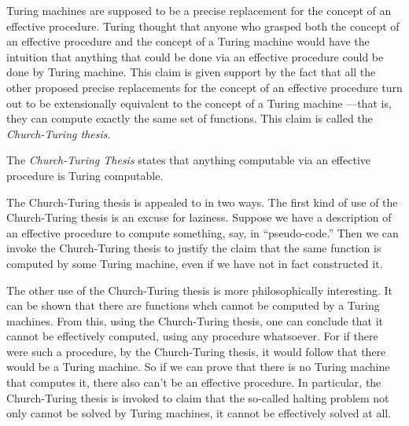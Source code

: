 \documentclass[../../../include/open-logic-section]{subfiles}
\begin{document}

Turing machines are supposed to be a precise replacement for the
concept of an effective procedure. Turing thought that anyone who
grasped both the concept of an effective procedure and the concept
of a Turing machine would have the intuition that anything that could
be done via an effective procedure could be done by Turing machine.
This claim is given support by the fact that all the other proposed
precise replacements for the concept of an effective procedure turn
out to be extensionally equivalent to the concept of a Turing machine
---that is, they can compute exactly the same set of functions. This
claim is called the \emph{Church-Turing thesis}.

\begin{defn}
The \emph{Church-Turing Thesis} states that anything computable via 
an effective procedure is Turing computable.
\end{defn}

The Church-Turing thesis is appealed to in two ways.  The first kind
of use of the Church-Turing thesis is an excuse for laziness.  Suppose
we have a description of an effective procedure to compute something,
say, in ``pseudo-code.''  Then we can invoke the Church-Turing thesis
to justify the claim that the same function is computed by some Turing
machine, even if we have not in fact constructed it.

The other use of the Church-Turing thesis is more philosophically
interesting.  It can be shown that there are functions whch cannot be
computed by a Turing machines.  From this, using the Church-Turing
thesis, one can conclude that it cannot be effectively computed, using
any procedure whatsoever.  For if there were such a procedure, by the
Church-Turing thesis, it would follow that there would be a Turing
machine.  So if we can prove that there is no Turing machine that
computes it, there also can't be an effective procedure.  In
particular, the Church-Turing thesis is invoked to claim that the
so-called halting problem not only cannot be solved by Turing
machines, it cannot be effectively solved at all.
\end{document}
